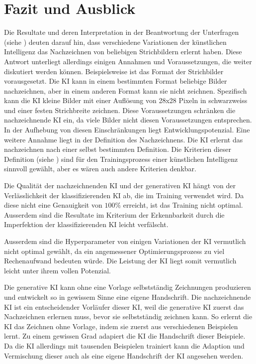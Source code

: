 \section{Fazit und Ausblick}\label{chap:d_faz-aus} Die Resultate und deren
Interpretation in der Beantwortung der Unterfragen (siehe
) deuten darauf hin, dass verschiedene Variationen der
künstlichen Intelligenz das Nachzeichnen von beliebigen Strichbildern erlernt
haben. Diese Antwort unterliegt allerdings einigen Annahmen und Voraussetzungen,
die weiter diskutiert werden können. Beispielsweise ist das Format der
Strichbilder vorausgesetzt. Die KI kann in einem bestimmten Format beliebige
Bilder nachzeichnen, aber in einem anderen Format kann sie nicht zeichnen.
Spezifisch kann die KI kleine Bilder mit einer Auflösung von 28x28 Pixeln in
schwarzweiss und einer festen Strichbreite zeichnen. Diese Voraussetzungen
schränken die nachzeichnende KI ein, da viele Bilder nicht diesen
Voraussetzungen entsprechen. In der Aufhebung von diesen Einschränkungen liegt
Entwicklungspotenzial. Eine weitere Annahme liegt in der Definition des
Nachzeichnens. Die KI erlernt das nachzeichnen nach einer selbst bestimmten
Definition. Die Kriterien dieser Definition (siehe ) sind
für den Trainingsprozess einer künstlichen Intelligenz sinnvoll gewählt, aber es
wären auch andere Kriterien denkbar.

Die Qualität der nachzeichnenden KI und der generativen KI hängt von der
Verlässlichkeit der klassifizierenden KI ab, die im Training verwendet wird. Da
diese nicht eine Genauigkeit von $100\%$ erreicht, ist das Training nicht
optimal. Ausserdem sind die Resultate im Kriterium der Erkennbarkeit durch die
Imperfektion der klassifizierenden KI leicht verfälscht.

Ausserdem sind die Hyperparameter von einigen Variationen der KI vermutlich
nicht optimal gewählt, da ein angemessener Optimierungsprozess zu viel
Rechenaufwand bedeuten würde. Die Leistung der KI liegt somit vermutlich leicht
unter ihrem vollen Potenzial.

Die generative KI kann ohne eine Vorlage selbstständig Zeichnungen produzieren
und entwickelt so in gewissem Sinne eine eigene Handschrift. Die nachzeichnende
KI ist ein entscheidender Vorläufer dieser KI, weil die generative KI zuerst das
Nachzeichnen erlernen muss, bevor sie selbstständig zeichnen kann. So erlernt
die KI das Zeichnen ohne Vorlage, indem sie zuerst aus verschiedenen Beispielen
lernt. Zu einem gewissen Grad adapiert die KI die Handschrift dieser Beispiele.
Da die KI allerdings mit tausenden Beispielen trainiert kann die Adaption und
Vermischung dieser auch als eine eigene Handschrift der KI angesehen werden.

